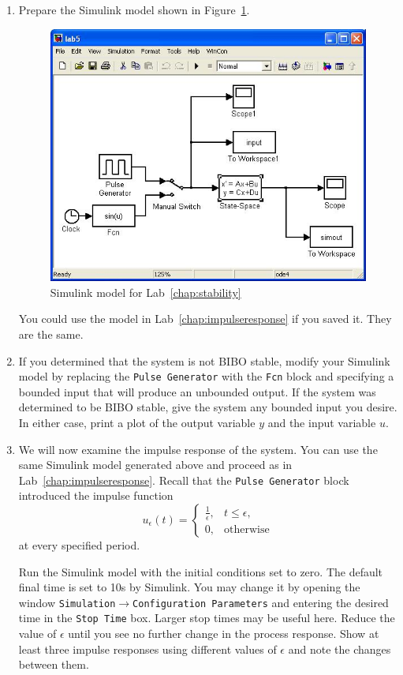 \begin{enumerate}
    \item Prepare the \textsf{Simulink} model shown in Figure~\ref{fig:model5}\@.
          \begin{figure}[htbp]
              \centering
              \includegraphics[width=0.6\hsize]{pix/model5.jpg}
              \caption{\textsf{Simulink} model for Lab~\ref{chap:stability}}\label{fig:model5}
          \end{figure}%
          You could use the model in Lab~\ref{chap:impulseresponse} if you saved it.
          They are the same.

    \item If you determined that the system is not BIBO stable, modify your
          \textsf{Simulink} model by replacing the \verb|Pulse Generator| with the
          \verb|Fcn| block and specifying a bounded input that will produce an
          unbounded output.  If the system was determined to be BIBO stable, give the
          system any bounded input you desire.  In either case, print a plot of the
          output variable \(y\) and the input variable \(u\).

    \item We will now examine the impulse response of the system.  You can use
          the same \textsf{Simulink} model generated above and proceed as in
          Lab~\ref{chap:impulseresponse}\@.  Recall that the \verb|Pulse Generator|
          block introduced the impulse function
          \begin{equation*}
              u_{\epsilon}(t)=\begin{cases}\frac{1}{\epsilon}, &
                  t\leq\epsilon,        \\0,&\textrm{otherwise}\end{cases}
          \end{equation*}
          at every specified period.

          Run the \textsf{Simulink} model with the initial conditions set to zero.  The
          default final time is set to 10s by \textsf{Simulink}\@.  You may change it
          by opening the window
          \verb|Simulation|\(\rightarrow \)\verb|Configuration Parameters| and entering
          the desired time in the \verb|Stop Time| box.  Larger stop times may be
          useful here. Reduce the value of \(\epsilon \) until you see no further change
          in the process response. Show at least three impulse responses using
          different values of \(\epsilon \) and note the changes between them.


\end{enumerate}
